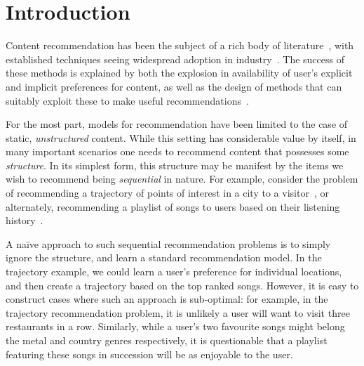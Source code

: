 
\secmoveup
\section{Introduction}
\label{sec:intro}
\textmoveup

Content recommendation has been the subject of a rich body of literature~\citep{Goldberg:1992,Sarwar:2001,Koren:2010},
with established techniques seeing widespread adoption in industry~\citep{Linden:2003,Agarwal:2013,Amatriain:2015,Gomez-Uribe:2015}.
The success of these methods is explained by both the explosion in availability of user's explicit and implicit preferences for content,
as well as the design of methods that can suitably exploit these to make useful recommendations~\citep{Koren:2009}.

For the most part, models for recommendation have been limited to the case of static, \emph{unstructured} content.
While this setting has considerable value by itself,
in many important scenarios one needs to recommend content that possesses some \emph{structure}.
In its simplest form, this structure may be manifest by the items we wish to recommend being \emph{sequential} in nature.
For example, consider the problem of
recommending a trajectory of points of interest in a city to a visitor~\citep{lu2010photo2trip,lu2012personalized,ijcai15,cikm16paper},
or alternately,
recommending a playlist of songs to users based on their listening history~\citep{McFee:2011,chen2012playlist,hidasi2015session,choi2016towards}.

A na\"{i}ve approach to such sequential recommendation problems is to simply ignore the structure,
and learn a standard recommendation model.
In the trajectory example, we could learn a user's preference for individual locations,
and then create a trajectory based on the top ranked songs.
However, it is easy to construct cases where such an approach is sub-optimal:
for example,
in the trajectory recommendation problem, it is unlikely a user will want to visit three restaurants in a row.
Similarly, 
while a user's two favourite songs might belong
the metal and country genres respectively,
it is questionable that a playlist featuring these songs in succession will be as enjoyable to the user.

